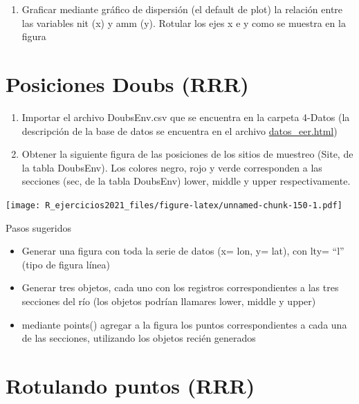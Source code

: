 \documentclass[]{book}
\providecommand{\tightlist}{%
  \setlength{\itemsep}{0pt}\setlength{\parskip}{0pt}}
\begin{document}
\begin{enumerate}
\def\labelenumi{\arabic{enumi}.}
\setcounter{enumi}{1}
\tightlist
\item
  Graficar mediante gráfico de dispersión (el default de plot) la relación entre las variables nit (x) y amm (y). Rotular los ejes x e y como se muestra en la figura
\end{enumerate}

\hypertarget{posiciones-doubs-rrr}{%
\section{Posiciones Doubs (RRR)}\label{posiciones-doubs-rrr}}

\begin{enumerate}
\def\labelenumi{\arabic{enumi}.}
\item
  Importar el archivo DoubsEnv.csv que se encuentra en la carpeta 4-Datos (la descripción de la base de datos se encuentra en el archivo \url{datos_eer.html})
\item
  Obtener la siguiente figura de las posiciones de los sitios de muestreo (Site, de la tabla DoubsEnv). Los colores negro, rojo y verde corresponden a las secciones (sec, de la tabla DoubsEnv) lower, middle y upper respectivamente.
\end{enumerate}

\texttt{[image: R\_ejercicios2021\_files/figure-latex/unnamed-chunk-150-1.pdf]}

Pasos sugeridos

\begin{itemize}
\tightlist
\item
  Generar una figura con toda la serie de datos (x= lon, y= lat), con lty= ``l'' (tipo de figura línea)
\item
  Generar tres objetos, cada uno con los registros correspondientes a las tres secciones del río (los objetos podrían llamares lower, middle y upper)
\item
  mediante points() agregar a la figura los puntos correspondientes a cada una de las secciones, utilizando los objetos recién generados
\end{itemize}

\hypertarget{rotulando-puntos-rrr}{%
\section{Rotulando puntos (RRR)}\label{rotulando-puntos-rrr}}
\end{document}

